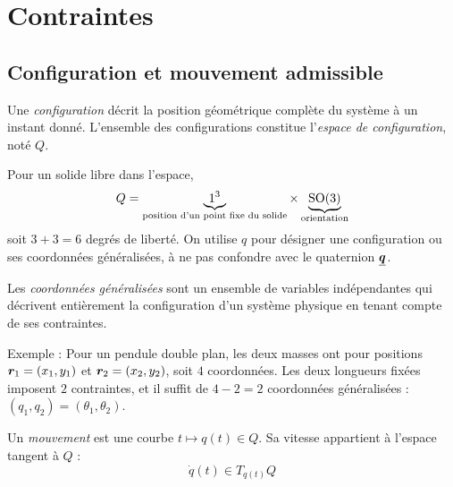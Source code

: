 
\section{Contraintes}

\subsection{Configuration et mouvement admissible}

\begin{definition}[Configuration]
    Une \emph{configuration} décrit la position géométrique complète du
    système à un instant donné. L'ensemble des configurations constitue
    l'\emph{espace de configuration}, noté $Q$.
\end{definition}

Pour un solide libre dans l'espace,
\[
    Q = \underbrace{1^3}_{\text{position d'un point fixe du solide}}
    \times
    \underbrace{\mathrm{SO}(3)}_{\text{orientation}}
\]
soit $3 + 3 = 6$ degrés de liberté. On utilise $q$ pour désigner une
configuration ou ses coordonnées généralisées, à ne pas confondre avec
le quaternion $\underline{\bm{q}}$.

\begin{definition}
    Les \emph{coordonnées généralisées} sont un ensemble de variables
    indépendantes qui décrivent entièrement la configuration d'un
    système physique en tenant compte de ses contraintes.
\end{definition}

Exemple : Pour un pendule double plan, les deux masses ont pour positions
$\bm{r}_1 = (x_1,y_1)$ et $\bm{r}_2 = (x_2,y_2)$, soit $4$
coordonnées. Les deux longueurs fixées imposent $2$ contraintes, et il
suffit de $4 - 2 = 2$ coordonnées généralisées : $(q_1,q_2) =
(\theta_1,\theta_2)$.

\begin{definition}[Mouvement]
    Un \emph{mouvement} est une courbe $t\mapsto q(t)\in Q$. Sa vitesse
    appartient à l'espace tangent à $Q$ :
    \[
        \dot q(t)\in T_{q(t)}Q
    \]
\end{definition}

